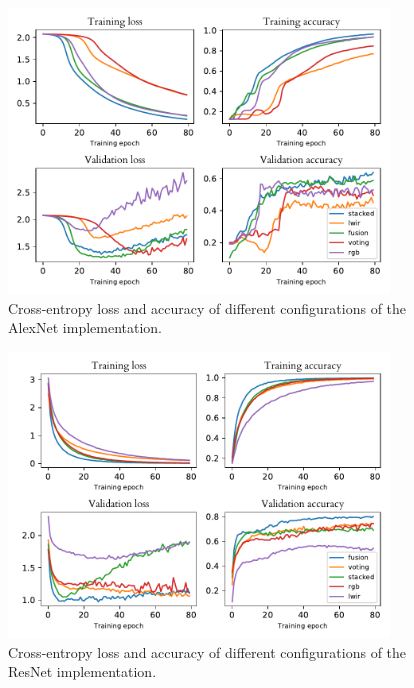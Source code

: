 \documentclass{l4proj}
\begin{document}
\begin{appendices}
\begin{figure}[ht]
  \centering
  \includegraphics[width=0.9\textwidth]{images/evaluation/gridsearch/AlexNet}
  \caption{Cross-entropy loss and accuracy of different configurations of the AlexNet implementation.}
  \label{fig:alexnet_configs}
\end{figure}

\begin{figure}[ht]
  \centering
  \includegraphics[width=0.9\textwidth]{images/evaluation/gridsearch/ResNet}
  \caption{Cross-entropy loss and accuracy of different configurations of the ResNet implementation.}
  \label{fig:resnet_configs_app}
\end{figure}



\end{appendices}
\end{document}
